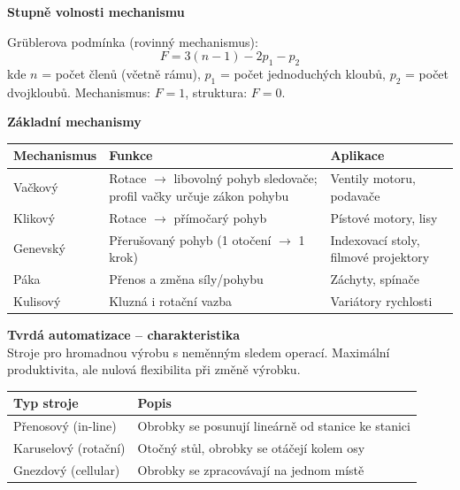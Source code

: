 \documentclass[a4paper,10pt]{article}
\begin{document}
\begin{vysvetlenibox}
\textbf{Stupně volnosti mechanismu}

\begin{vzorcebox}
Grüblerova podmínka (rovinný mechanismus):
$$F = 3(n-1) - 2p_1 - p_2$$
kde $n$ = počet členů (včetně rámu), $p_1$ = počet jednoduchých kloubů,
$p_2$ = počet dvojkloubů. Mechanismus: $F=1$, struktura: $F=0$.
\end{vzorcebox}

\textbf{Základní mechanismy}

\begin{center}
\begin{tabularx}{0.95\linewidth}{@{} l X l @{}}
    \toprule
    \textbf{Mechanismus} & \textbf{Funkce} & \textbf{Aplikace} \\
    \midrule
    Vačkový      & Rotace $\to$ libovolný pohyb sledovače;
                   profil vačky určuje zákon pohybu & Ventily motoru, podavače \\
    Klikový       & Rotace $\to$ přímočarý pohyb & Pístové motory, lisy \\
    Genevský      & Přerušovaný pohyb (1 otočení $\to$ 1 krok)
                  & Indexovací stoly, filmové projektory \\
    Páka          & Přenos a změna síly/pohybu & Záchyty, spínače \\
    Kulisový      & Kluzná i rotační vazba & Variátory rychlosti \\
    \bottomrule
\end{tabularx}
\end{center}

\textbf{Tvrdá automatizace -- charakteristika}\\
Stroje pro hromadnou výrobu s neměnným sledem operací.
Maximální produktivita, ale nulová flexibilita při změně výrobku.

\begin{center}
\begin{tabularx}{0.95\linewidth}{@{} l X @{}}
    \toprule
    \textbf{Typ stroje} & \textbf{Popis} \\
    \midrule
    Přenosový (in-line) & Obrobky se posunují lineárně od stanice ke stanici \\
    Karuselový (rotační) & Otočný stůl, obrobky se otáčejí kolem osy \\
    Gnezdový (cellular)  & Obrobky se zpracovávají na jednom místě \\
    \bottomrule
\end{tabularx}
\end{center}
\end{vysvetlenibox}
\end{document}
